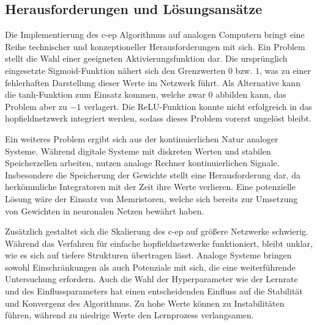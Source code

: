 \subsection{Herausforderungen und Lösungsansätze}

Die Implementierung des \gls{c-ep} Algorithmus auf analogen Computern bringt eine Reihe technischer und konzeptioneller Herausforderungen mit sich. Ein Problem stellt die Wahl einer geeigneten Aktivierungsfunktion dar. Die ursprünglich eingesetzte Sigmoid-Funktion nähert sich den Grenzwerten \(0\) bzw. \(1\), was zu einer fehlerhaften Darstellung dieser Werte im Netzwerk führt. Als Alternative kann die tanh-Funktion zum Einsatz kommen, welche zwar \(0\) abbilden kann, das Problem aber zu \(-1\) verlagert. Die ReLU-Funktion konnte nicht erfolgreich in das \gls{hopfieldnetzwerk} integriert werden, sodass dieses Problem vorerst ungelöst bleibt.

Ein weiteres Problem ergibt sich aus der kontinuierlichen Natur analoger Systeme. Während digitale Systeme mit diskreten Werten und stabilen Speicherzellen arbeiten, nutzen analoge Rechner kontinuierlichen Signale. Insbesondere die Speicherung der Gewichte stellt eine Herausforderung dar, da herkömmliche Integratoren mit der Zeit ihre Werte verlieren. Eine potenzielle Lösung wäre der Einsatz von Memristoren, welche sich bereits zur Umsetzung von Gewichten in neuronalen Netzen bewährt haben.

Zusätzlich gestaltet sich die Skalierung des \gls{c-ep} auf größere Netzwerke schwierig. Während das Verfahren für einfache \gls{hopfieldnetzwerk}e funktioniert, bleibt unklar, wie es sich auf tiefere Strukturen übertragen lässt. Analoge Systeme bringen sowohl Einschränkungen als auch Potenziale mit sich, die eine weiterführende Untersuchung erfordern. Auch die Wahl der Hyperparameter wie der Lernrate und des Einflussparameters hat einen entscheidenden Einfluss auf die Stabilität und Konvergenz des Algorithmus. Zu hohe Werte können zu Instabilitäten führen, während zu niedrige Werte den Lernprozess verlangsamen.
